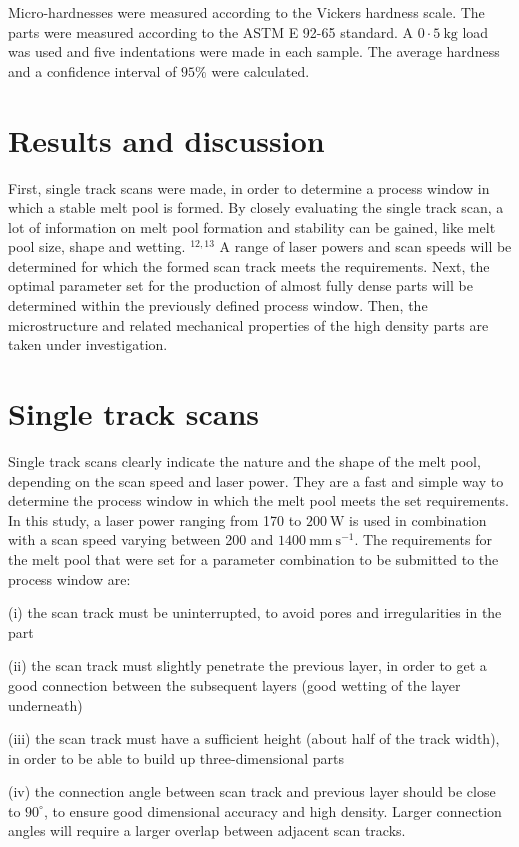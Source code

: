 \documentclass[10pt]{article}
\begin{document}
Micro-hardnesses were measured according to the Vickers hardness scale. The parts were measured according to the ASTM E 92-65 standard. A $0 \cdot 5 \mathrm{~kg}$ load was used and five indentations were made in each sample. The average hardness and a confidence interval of $95 \%$ were calculated.

\section*{Results and discussion}
First, single track scans were made, in order to determine a process window in which a stable melt pool is formed. By closely evaluating the single track scan, a lot of information on melt pool formation and stability can be gained, like melt pool size, shape and wetting. ${ }^{12,13}$ A range of laser powers and scan speeds will be determined for which the formed scan track meets the requirements. Next, the optimal parameter set for the production of almost fully dense parts will be determined within the previously defined process window. Then, the microstructure and related mechanical properties of the high density parts are taken under investigation.

\section*{Single track scans}
Single track scans clearly indicate the nature and the shape of the melt pool, depending on the scan speed and laser power. They are a fast and simple way to determine the process window in which the melt pool meets the set requirements. In this study, a laser power ranging from 170 to $200 \mathrm{~W}$ is used in combination with a scan speed varying between 200 and $1400 \mathrm{~mm} \mathrm{~s}^{-1}$. The requirements for the melt pool that were set for a parameter combination to be submitted to the process window are:

(i) the scan track must be uninterrupted, to avoid pores and irregularities in the part

(ii) the scan track must slightly penetrate the previous layer, in order to get a good connection between the subsequent layers (good wetting of the layer underneath)

(iii) the scan track must have a sufficient height (about half of the track width), in order to be able to build up three-dimensional parts

(iv) the connection angle between scan track and previous layer should be close to $90^{\circ}$, to ensure good dimensional accuracy and high density. Larger connection angles will require a larger overlap between adjacent scan tracks.
\end{document}
